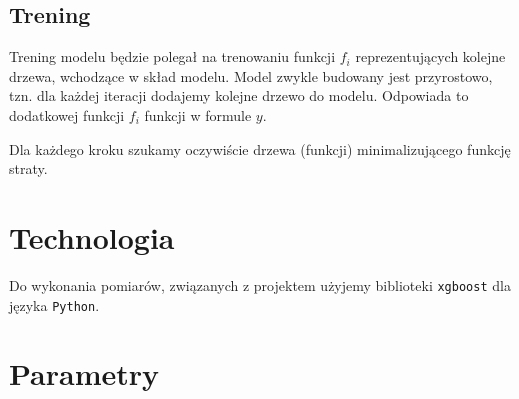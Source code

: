 \documentclass[a4paper,12p]{article}
\begin{document}
\subsection{Trening}

Trening modelu będzie polegał na trenowaniu funkcji $f_i$ reprezentujących kolejne drzewa, wchodzące w skład modelu. Model zwykle budowany jest przyrostowo, tzn. dla każdej iteracji dodajemy kolejne drzewo do modelu. Odpowiada to dodatkowej funkcji $f_i$ funkcji w formule $y$.

Dla każdego kroku szukamy oczywiście drzewa (funkcji) minimalizującego funkcję straty. 

\section{Technologia}

Do wykonania pomiarów, związanych z projektem użyjemy biblioteki \texttt{xgboost} dla języka \texttt{Python}.

\section{Parametry}

\begin{center}

\end{center}

\end{document}
